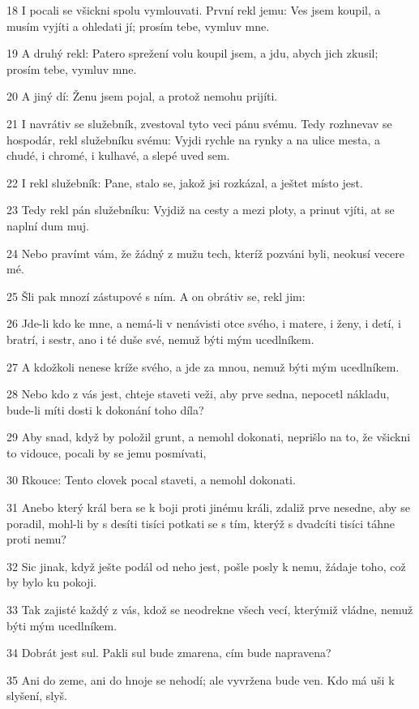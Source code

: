 \par 18 I pocali se všickni spolu vymlouvati. První rekl jemu: Ves jsem koupil, a musím vyjíti a ohledati jí; prosím tebe, vymluv mne.
\par 19 A druhý rekl: Patero sprežení volu koupil jsem, a jdu, abych jich zkusil; prosím tebe, vymluv mne.
\par 20 A jiný dí: Ženu jsem pojal, a protož nemohu prijíti.
\par 21 I navrátiv se služebník, zvestoval tyto veci pánu svému. Tedy rozhnevav se hospodár, rekl služebníku svému: Vyjdi rychle na rynky a na ulice mesta, a chudé, i chromé, i kulhavé, a slepé uved sem.
\par 22 I rekl služebník: Pane, stalo se, jakož jsi rozkázal, a ještet místo jest.
\par 23 Tedy rekl pán služebníku: Vyjdiž na cesty a mezi ploty, a prinut vjíti, at se naplní dum muj.
\par 24 Nebo pravímt vám, že žádný z mužu tech, kteríž pozváni byli, neokusí vecere mé.
\par 25 Šli pak mnozí zástupové s ním. A on obrátiv se, rekl jim:
\par 26 Jde-li kdo ke mne, a nemá-li v nenávisti otce svého, i matere, i ženy, i detí, i bratrí, i sestr, ano i té duše své, nemuž býti mým ucedlníkem.
\par 27 A kdožkoli nenese kríže svého, a jde za mnou, nemuž býti mým ucedlníkem.
\par 28 Nebo kdo z vás jest, chteje staveti veži, aby prve sedna, nepocetl nákladu, bude-li míti dosti k dokonání toho díla?
\par 29 Aby snad, když by položil grunt, a nemohl dokonati, neprišlo na to, že všickni to vidouce, pocali by se jemu posmívati,
\par 30 Rkouce: Tento clovek pocal staveti, a nemohl dokonati.
\par 31 Anebo který král bera se k boji proti jinému králi, zdaliž prve nesedne, aby se poradil, mohl-li by s desíti tisíci potkati se s tím, kterýž s dvadcíti tisíci táhne proti nemu?
\par 32 Sic jinak, když ješte podál od neho jest, pošle posly k nemu, žádaje toho, což by bylo ku pokoji.
\par 33 Tak zajisté každý z vás, kdož se neodrekne všech vecí, kterýmiž vládne, nemuž býti mým ucedlníkem.
\par 34 Dobrát jest sul. Pakli sul bude zmarena, cím bude napravena?
\par 35 Ani do zeme, ani do hnoje se nehodí; ale vyvržena bude ven. Kdo má uši k slyšení, slyš.

